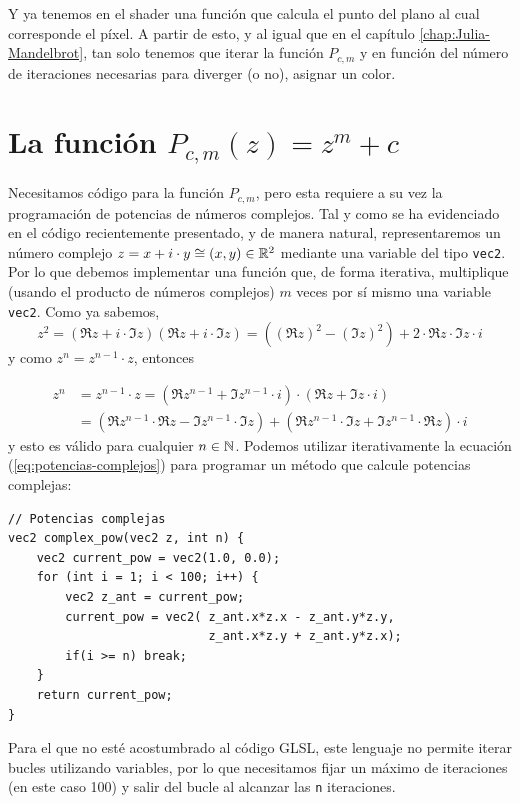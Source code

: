 Y ya tenemos en el shader una función que calcula el punto del plano al cual corresponde el píxel. A partir de esto, y al igual que en el capítulo \ref{chap:Julia-Mandelbrot}, tan solo tenemos que iterar la función $P_{c,m}$ y en función del número de iteraciones necesarias para diverger (o no), asignar un color.

\section{La función $P_{c,m}(z)=z^m+c$}

Necesitamos código para la función $P_{c,m}$, pero esta requiere a su vez la programación de potencias de números complejos. Tal y como se ha evidenciado en el código recientemente presentado, y de manera natural, representaremos un número complejo $z=x+i\cdot y\cong (x,y)\in\mathbb{R}^2$ mediante una variable del tipo \verb|vec2|. Por lo que debemos implementar una función que, de forma iterativa, multiplique (usando el producto de números complejos) $m$ veces por sí mismo una variable \verb|vec2|. Como ya sabemos,
$$
z^2 = (\Re z+i\cdot \Im z)(\Re z+i\cdot \Im z) = ((\Re z)^2-(\Im z)^2) + 2\cdot\Re z\cdot\Im z\cdot i
$$
y como $z^n = z^{n-1}\cdot z$, entonces

\begin{equation}
    \label{eq:potencias-complejos}
    \begin{split}
        z^n & = z^{n-1}\cdot z = (\Re z^{n-1} + \Im z^{n-1}\cdot i)\cdot(\Re z + \Im z\cdot i) \\
        & = \left(\Re z^{n-1}\cdot\Re z - \Im z^{n-1}\cdot \Im z\right) + \left(\Re z^{n-1}\cdot\Im z + \Im z^{n-1}\cdot\Re z\right)\cdot i 
    \end{split}
\end{equation}
y esto es válido para cualquier $n\in\mathbb{N}$. Podemos utilizar iterativamente la ecuación (\ref{eq:potencias-complejos}) para programar un método que calcule potencias complejas:
\begin{lstlisting}
// Potencias complejas
vec2 complex_pow(vec2 z, int n) {
    vec2 current_pow = vec2(1.0, 0.0);
    for (int i = 1; i < 100; i++) {
        vec2 z_ant = current_pow;
        current_pow = vec2( z_ant.x*z.x - z_ant.y*z.y, 
                            z_ant.x*z.y + z_ant.y*z.x);
        if(i >= n) break;
    }
    return current_pow;
}
\end{lstlisting}

Para el que no esté acostumbrado al código GLSL, este lenguaje no permite iterar bucles utilizando variables, por lo que necesitamos fijar un máximo de iteraciones (en este caso 100) y salir del bucle al alcanzar las \verb|n| iteraciones.

